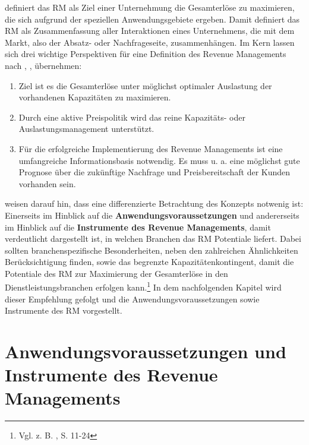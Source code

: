 \cite{Petrick:2009aa} definiert das RM als Ziel einer Unternehmung die Gesamterlöse zu maximieren, die sich aufgrund der speziellen Anwendungsgebiete ergeben. Damit definiert \cite{Petrick:2009aa} das RM als Zusammenfassung aller Interaktionen eines Unternehmens, die mit dem Markt, also der Absatz- oder Nachfrageseite, zusammenhängen. Im Kern lassen sich drei wichtige Perspektiven für eine Definition des Revenue Managements nach \cite{Petrick:2009aa}, \cite{stuhlmann2000kapazitatsgestaltung},  \cite{corsten1999yield} übernehmen:
\begin{enumerate}
	\item Ziel ist es die Gesamterlöse unter möglichst optimaler Auslastung der vorhandenen Kapazitäten zu maximieren.
	\item Durch eine aktive Preispolitik wird das reine Kapazitäts- oder Auslastungsmanagement unterstützt.
	\item Für die erfolgreiche Implementierung des Revenue Managements ist eine umfangreiche Informationsbasis notwendig. Es muss u. a. eine möglichst gute Prognose über die zukünftige Nachfrage und Preisbereitschaft der Kunden vorhanden sein.
\end{enumerate}

\cite{kimms2005revenue} weisen darauf hin, dass eine differenzierte Betrachtung des Konzepts notwenig ist: Einerseits im Hinblick auf die \textbf{Anwendungsvoraussetzungen} und andererseits im Hinblick auf die \textbf{Instrumente des Revenue Managements}, damit verdeutlicht dargestellt ist, in welchen Branchen das RM Potentiale liefert. Dabei sollten branchenspezifische Besonderheiten, neben den zahlreichen Ähnlichkeiten Berücksichtigung finden, sowie das begrenzte Kapazitätenkontingent, damit die Potentiale des RM zur Maximierung der Gesamterlöse in den Dienstleistungsbranchen erfolgen kann.\footnote{Vgl. z. B. \cite{Martens:2009aa}, S. 11-24} In dem nachfolgenden Kapitel wird dieser Empfehlung gefolgt und die Anwendungsvoraussetzungen sowie Instrumente des RM vorgestellt.

\section{Anwendungsvoraussetzungen und Instrumente des Revenue Managements}

